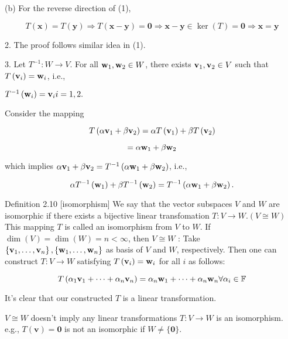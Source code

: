 \documentclass[11pt]{article}
\begin{document}
(b) For the reverse direction of (1),

\[
T\left( \mathbf{x}\right)  = T\left( \mathbf{y}\right)  \Rightarrow  T\left( {\mathbf{x} - \mathbf{y}}\right)  = \mathbf{0} \Rightarrow  \mathbf{x} - \mathbf{y} \in  \ker \left( T\right)  = \mathbf{0} \Rightarrow  \mathbf{x} = \mathbf{y}
\]

2. The proof follows similar idea in (1).

3. Let \({T}^{-1} : W \rightarrow  V\). For all \({\bf w}_1,{\bf w}_2 \in  W\), there exists \({\bf v}_1,{\bf v}_2 \in  V\) such that \(T\left( {\bf v}_{i}\right)  = {\bf w}_{i}\), i.e.,

\({T}^{-1}\left( {\bf w}_{i}\right)  = {\bf v}_{i}i = 1,2.\)

Consider the mapping

\[
T\left( {\alpha {\bf v}_1 + \beta {\bf v}_2}\right)  = {\alpha T}\left( {\bf v}_1\right)  + {\beta T}\left( {\bf v}_2\right)
\]

\[
= \alpha {\bf w}_1 + \beta {\bf w}_2
\]

which implies \(\alpha {\bf v}_1 + \beta {\bf v}_2 = {T}^{-1}\left( {\alpha {\bf w}_1 + \beta {\bf w}_2}\right)\), i.e.,

\[
\alpha {T}^{-1}\left( {\bf w}_1\right)  + \beta {T}^{-1}\left( {\bf w}_2\right)  = {T}^{-1}\left( {\alpha {\bf w}_1 + \beta {\bf w}_2}\right) .
\]

Definition 2.10 [isomorphism] We say that the vector subspaces \(V\) and \(W\) are isomorphic if there exists a bijective linear transfomation \(T : V \rightarrow  W.\left( {V \cong  W}\right)\) This mapping \(T\) is called an isomorphism from \(V\) to \(W\). If \(\dim \left( V\right)  = \dim \left( W\right)  = n < \infty\), then \(V \cong  W\) : Take \(\left\{  {{\bf v}_1,\ldots ,{\bf v}_n}\right\}  ,\left\{  {{\bf w}_1,\ldots ,{\bf w}_n}\right\}\) as basis of \(V\) and \(W\), respectively. Then one can construct \(T : V \rightarrow  W\) satisfying \(T\left( {\bf v}_{i}\right)  = {\bf w}_{i}\) for all \(i\) as follows:

\[
T\left( {\alpha_1{\bf v}_1 + \cdots  + \alpha_n{\bf v}_n}\right)  = \alpha_n{\bf w}_1 + \cdots  + \alpha_n{\bf w}_n\forall \alpha_{i} \in  \mathbb{F}
\]

It’s clear that our constructed \(T\) is a linear transformation.

\(V \cong  W\) doesn’t imply any linear transformations \(T : V \rightarrow  W\) is an isomorphism. e.g., \(T\left( \mathbf{v}\right)  = \mathbf{0}\) is not an isomorphic if \(W \neq  \{ \mathbf{0}\}\).
\end{document}

